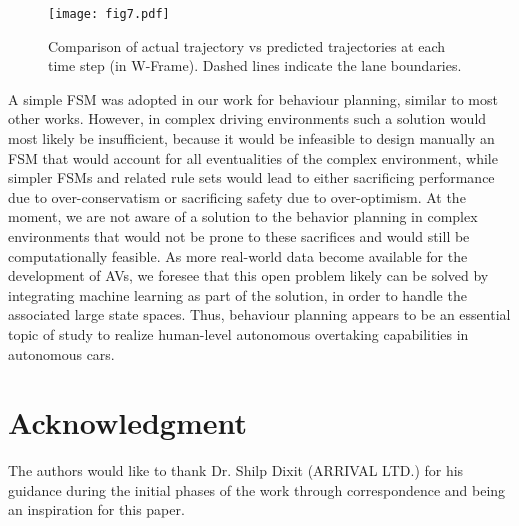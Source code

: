 \documentclass[letterpaper, 10 pt, conference]{ieeeconf}
\begin{document}
\begin{figure}[!t]
  \centering
  \texttt{[image: fig7.pdf]}
  \caption{Comparison of  actual trajectory vs predicted trajectories at each time step (in W-Frame). Dashed lines indicate the lane boundaries.}
  \label{fig:xpred}
\end{figure}

A simple FSM was adopted in our work for behaviour planning, similar to most other works. 
However, in complex driving environments such a solution would most likely be insufficient, because it would be infeasible to design manually an FSM that would account for all eventualities of the complex environment, while 
simpler FSMs and related rule sets would lead to either sacrificing performance due to over-conservatism or sacrificing safety due to over-optimism. 
At the moment, we are not aware of a solution to the behavior planning in complex environments that would not be prone to these sacrifices and would still be computationally feasible.
As more real-world data become available for the development of AVs, we foresee that this open problem likely can be solved by integrating machine learning as part of the solution, in order to handle the associated large state spaces.
Thus, behaviour planning appears to be an essential topic of study to realize human-level autonomous overtaking capabilities in autonomous cars.


\section*{Acknowledgment}
The authors would like to thank Dr. Shilp Dixit (ARRIVAL LTD.) for his guidance during the initial phases of the work through correspondence and being an inspiration for this paper.



\end{document}
